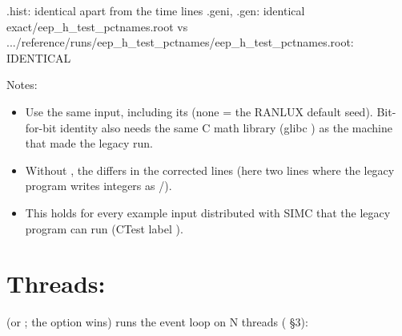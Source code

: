 \begin{simcplain}[basicstyle=\ttfamily\tiny]
.hist: identical apart from the time lines
.geni, .gen: identical
exact/eep_h_test_pctnames.root vs .../reference/runs/eep_h_test_pctnames/eep_h_test_pctnames.root: IDENTICAL
\end{simcplain}
Notes:

\begin{itemize}
\item Use the same input, including its \hyperref[param:randomu5fseed]{} (none = the RANLUX default seed). Bit-for-bit identity also needs the
same C math library (glibc ) as the machine that made the legacy run.
\item Without , the  differs in the corrected lines (here two lines where the legacy program writes
integers as /).
\item This holds for every example input distributed with SIMC that the legacy program can run (CTest label
).
\end{itemize}
\section{\texorpdfstring{Threads: }{Threads: -{}-threads N}}\label{user_manual-08u5frunningu5fandu5freproducibility:85-threads---threads-n}
 (or ; the option wins) runs the event loop on N threads
( §3):

